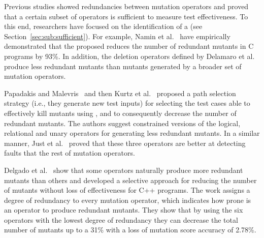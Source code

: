 Previous studies showed redundancies between mutation operators and proved that a certain subset of operators is sufficient to measure test effectiveness. To this end, researchers have focused on the identification of a  (see Section~\ref{sec:sub:sufficient}). 
For example, Namin et al.~\cite{siami2008sufficient} have empirically demonstrated that the proposed  reduces the number of redundant mutants in C programs by 93\%. 
In addition, the deletion operators defined by Delamaro et al.~\cite{delamaro2014designing} produce less redundant mutants than mutants generated by a broader set of mutation operators.

Papadakis and Malevris~\cite{papadakis2012mutation} and then Kurtz et al.~\cite{kurtz2015static} proposed a path selection strategy (i.e., they generate new test inputs) for selecting the test cases able to effectively kill mutants using , and to consequently decrease the number of redundant mutants. 
The authors suggest constrained versions of the logical, relational and unary operators for generating less redundant mutants. 
In a similar manner, Just et al.~\cite{just2012redundant,just2015higher} proved that these three operators are better at detecting faults that the rest of mutation operators.

Delgado et al.~\cite{delgado2017assessment} show that some operators naturally produce more redundant mutants than others and
developed a selective approach for reducing the number of mutants without loss of effectiveness for C++ programs. 
The work assigns a degree of redundancy to every mutation operator, which indicates how prone is an operator to produce redundant mutants. They show that by using the six operators with the lowest degree of redundancy they can decrease the total number of mutants up to a 31\% with a loss of mutation score accuracy of 2.78\%.

